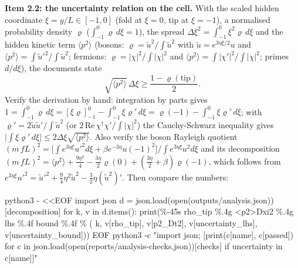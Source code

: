 \documentclass[
  10pt,
]{article}
\newenvironment{Shaded}{}{}
\newcommand{\NormalTok}[1]{#1}
\begin{document}
\textbf{Item 2.2: the uncertainty relation on the cell.} With the scaled
hidden coordinate \(\xi = y/L \in [-1, 0]\) (fold at \(\xi = 0\), tip at
\(\xi = -1\)), a normalised probability density \(\varrho\)
(\(\int_{-1}^{0}\varrho\,d\xi = 1\)), the spread
\(\Delta\xi^2 = \int_{-1}^{0}\xi^2\varrho\,d\xi\) and the hidden kinetic
term \(\langle p^2\rangle\) (bosons:
\(\varrho = \tilde u^2/\!\int\tilde u^2\) with
\(\tilde u = e^{3\eta\xi/2}u\) and
\(\langle p^2\rangle = \int\tilde u'^2/\!\int\tilde u^2\); fermions:
\(\varrho = |\chi|^2/\!\int|\chi|^2\) and
\(\langle p^2\rangle = \int|\chi'|^2/\!\int|\chi|^2\); primes
\(d/d\xi\)), the documents state
\[ \sqrt{\langle p^2\rangle}\,\Delta\xi \ge \frac{1 - \varrho(\text{tip})}{2}. \]
Verify the derivation by hand: integration by parts gives
\(1 = \int_{-1}^{0}\varrho\,d\xi = [\xi\varrho]_{-1}^{0} - \int_{-1}^{0}\xi\varrho'\,d\xi = \varrho(-1) - \int_{-1}^{0}\xi\varrho'\,d\xi\);
with \(\varrho' = 2\tilde u\tilde u'/\!\int\tilde u^2\) (or
\(2\,\mathrm{Re}\,\chi^\dagger\chi'/\!\int|\chi|^2\)) the Cauchy-Schwarz
inequality gives
\(\lvert\int\xi\varrho'\,d\xi\rvert \le 2\Delta\xi\sqrt{\langle p^2\rangle}\).
Also verify the boson Rayleigh quotient
\((m\,fL)^2 = \big[\int e^{3\eta\xi}u'^2d\xi + \beta e^{-3\eta}u(-1)^2\big]/\!\int e^{3\eta\xi}u^2d\xi\)
and its decomposition
\((m\,fL)^2 = \langle p^2\rangle + \tfrac{9\eta^2}{4} - \tfrac{3\eta}{2}\varrho(0) + (\tfrac{3\eta}{2} + \beta)\varrho(-1)\),
which follows from
\(e^{3\eta\xi}u'^2 = \tilde u'^2 + \tfrac94\eta^2\tilde u^2 - \tfrac32\eta(\tilde u^2)'\).
Then compare the numbers:

\begin{Shaded}
\begin{Highlighting}[]
\NormalTok{python3 {-} \textless{}\textless{}\textquotesingle{}EOF\textquotesingle{}}
\NormalTok{import json}
\NormalTok{d = json.load(open(\textquotesingle{}outputs/analysis.json\textquotesingle{}))[\textquotesingle{}decomposition\textquotesingle{}]}
\NormalTok{for k, v in d.items():}
\NormalTok{    print(\textquotesingle{}\%{-}45s rho\_tip \%.4g  \textless{}p2\textgreater{}Dxi2 \%.4g  lhs \%.4f  bound \%.4f\textquotesingle{} \% (}
\NormalTok{        k, v[\textquotesingle{}rho\_tip\textquotesingle{}], v[\textquotesingle{}p2\_Dt2\textquotesingle{}], v[\textquotesingle{}uncertainty\_lhs\textquotesingle{}], v[\textquotesingle{}uncertainty\_bound\textquotesingle{}]))}
\NormalTok{EOF}
\NormalTok{python3 {-}c "import json; [print(c[\textquotesingle{}name\textquotesingle{}], c[\textquotesingle{}passed\textquotesingle{}]) for c in json.load(open(\textquotesingle{}reports/analysis{-}checks.json\textquotesingle{}))[\textquotesingle{}checks\textquotesingle{}] if \textquotesingle{}uncertainty\textquotesingle{} in c[\textquotesingle{}name\textquotesingle{}]]"}
\end{Highlighting}
\end{Shaded}
\end{document}
